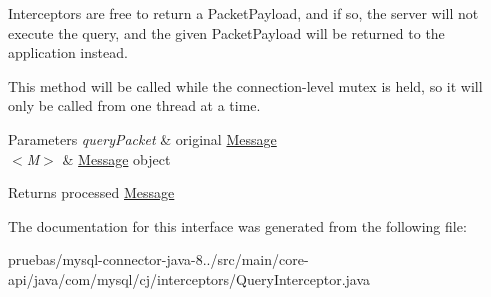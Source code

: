 Interceptors are free to return a Packet\+Payload, and if so, the server will not execute the query, and the given Packet\+Payload will be returned to the application instead.

This method will be called while the connection-\/level mutex is held, so it will only be called from one thread at a time.


\begin{DoxyParams}{Parameters}
{\em query\+Packet} & original \mbox{\hyperlink{}{Message}} \\
\hline
{\em $<$\+M$>$} & \mbox{\hyperlink{}{Message}} object \\
\hline
\end{DoxyParams}
\begin{DoxyReturn}{Returns}
processed \mbox{\hyperlink{}{Message}} 
\end{DoxyReturn}


The documentation for this interface was generated from the following file\+:\begin{DoxyCompactItemize}
\item 
pruebas/mysql-\/connector-\/java-\/8../src/main/core-\/api/java/com/mysql/cj/interceptors/Query\+Interceptor.\+java\end{DoxyCompactItemize}
